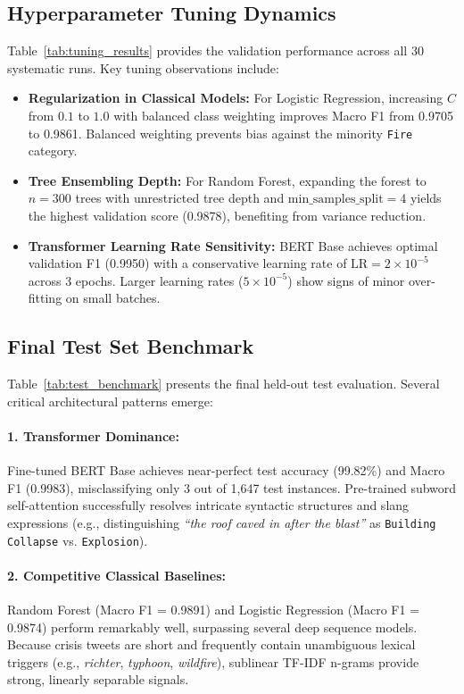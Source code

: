 \documentclass[11pt,a4paper]{article}
\begin{document}
\subsection{Hyperparameter Tuning Dynamics}
Table~\ref{tab:tuning_results} provides the validation performance across all 30 systematic runs. Key tuning observations include:
\begin{itemize}
    \item \textbf{Regularization in Classical Models:} For Logistic Regression, increasing $C$ from $0.1$ to $1.0$ with balanced class weighting improves Macro F1 from 0.9705 to 0.9861. Balanced weighting prevents bias against the minority \texttt{Fire} category.
    \item \textbf{Tree Ensembling Depth:} For Random Forest, expanding the forest to $n=300$ trees with unrestricted tree depth and $\text{min\_samples\_split}=4$ yields the highest validation score (0.9878), benefiting from variance reduction.
    \item \textbf{Transformer Learning Rate Sensitivity:} BERT Base achieves optimal validation F1 (0.9950) with a conservative learning rate of $\text{LR} = 2\times 10^{-5}$ across 3 epochs. Larger learning rates ($5\times 10^{-5}$) show signs of minor over-fitting on small batches.
\end{itemize}

\subsection{Final Test Set Benchmark}
Table~\ref{tab:test_benchmark} presents the final held-out test evaluation. Several critical architectural patterns emerge:

\paragraph{1. Transformer Dominance:}
Fine-tuned BERT Base achieves near-perfect test accuracy (99.82\%) and Macro F1 (0.9983), misclassifying only 3 out of 1,647 test instances. Pre-trained subword self-attention successfully resolves intricate syntactic structures and slang expressions (e.g., distinguishing \textit{``the roof caved in after the blast''} as \texttt{Building Collapse} vs. \texttt{Explosion}).

\paragraph{2. Competitive Classical Baselines:}
Random Forest (Macro F1 = 0.9891) and Logistic Regression (Macro F1 = 0.9874) perform remarkably well, surpassing several deep sequence models. Because crisis tweets are short and frequently contain unambiguous lexical triggers (e.g., \textit{richter}, \textit{typhoon}, \textit{wildfire}), sublinear TF-IDF n-grams provide strong, linearly separable signals.
\end{document}
